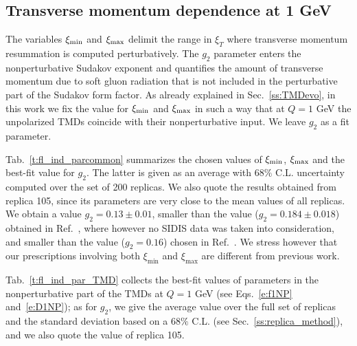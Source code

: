 \documentclass[aps,preprintnumbers,showpacs,nofootinbib,superscriptaddress,floatfix]{revtex4}
\newcommand{\AS}[1]{{\textcolor[rgb]{1,0,1}{#1}}}
\newcommand{\T}{\perp}
\newcommand{\bT}{\xi_T}
\newcommand{\bb}{\xi}
\begin{document}
\subsection{Transverse momentum dependence at 1 GeV}
\label{ss:bestfit_TMDs}

The variables $\bb_{\rm min}$ and $\bb_{\rm max}$ delimit the range in $\bT$
where transverse momentum resummation is computed perturbatively. 
The $g_2$ parameter enters the nonperturbative Sudakov exponent and
quantifies the amount of transverse momentum 
due to soft gluon radiation that is not included in the
perturbative part of the Sudakov form factor.
As already explained in Sec.~\ref{ss:TMDevo}, in this work we fix the value for
$\bb_{\rm min}$ and $\bb_{\rm max}$ in such a way that at $Q=1$ GeV the
unpolarized TMDs coincide with their nonperturbative input. We leave $g_2$ as 
a fit parameter. 

Tab.~\ref{t:fl_ind_parcommon} summarizes the chosen values of $\bb_{\rm min}$,
$\bb_{\rm max}$ and the best-fit value for $g_2$. The latter is given as an
average with $68\%$ C.L. uncertainty computed over the set of 200 replicas. We also quote the results obtained from
replica 105, since its parameters are very close to the
mean values of all replicas. 
We obtain a value $g_2=0.13 \pm 0.01$, smaller than the value ($g_2 = 0.184 \pm 0.018$) obtained in Ref.~\cite{Konychev:2005iy},
where however no SIDIS data was taken into consideration, and smaller than the
value ($g_2=0.16$) chosen in Ref.~\cite{Echevarria:2014xaa}. We stress however
that our prescriptions involving both $\bb_{\text{min}}$ and
$\bb_{\text{max}}$ are different from previous work.

Tab.~\ref{t:fl_ind_par_TMD} collects the best-fit values of parameters in the
nonperturbative part of the TMDs at $Q=1$ GeV (see Eqs.~\eqref{e:f1NP}
and~\eqref{e:D1NP}); as for $g_2$, we give the average value over the full set
of replicas and the standard deviation based on a $68\%$ C.L. (see
Sec.~\ref{ss:replica_method}), and we also quote the value of replica 105.

\end{document}
